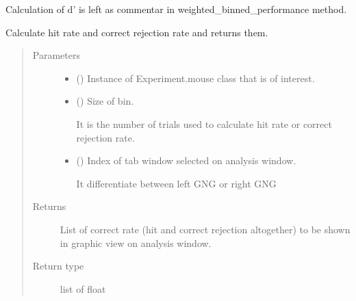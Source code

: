 \documentclass[letterpaper,10pt,english]{sphinxmanual}
\begin{document}
\sphinxAtStartPar
Calculation of d’ is left as commentar in
weighted\_binned\_performance method.

\begin{fulllineitems}
\label{\detokenize{NoSeMazeController/Analysis:Analysis.Analysis.binned_performance}}
\pysigstartsignatures
{}
\pysigstopsignatures
\sphinxAtStartPar
Calculate hit rate and correct rejection rate and returns them.
\begin{quote}\begin{description}
\item[{Parameters}] \leavevmode\begin{itemize}
\item {} 
\sphinxAtStartPar
{} () \textendash{} Instance of Experiment.mouse class that is of interest.

\item {} 
\sphinxAtStartPar
{} () \textendash{} 
\sphinxAtStartPar
Size of bin.

\sphinxAtStartPar
It is the number of trials used to calculate hit rate or
correct rejection rate.


\item {} 
\sphinxAtStartPar
{} () \textendash{} 
\sphinxAtStartPar
Index of tab window selected on analysis window.

\sphinxAtStartPar
It differentiate between left GNG or right GNG


\end{itemize}

\item[{Returns}] \leavevmode
\sphinxAtStartPar
{} \textendash{} List of correct rate (hit and correct rejection altogether) to be shown
in graphic view on analysis window.

\item[{Return type}] \leavevmode
\sphinxAtStartPar
list of float

\end{description}\end{quote}

\end{fulllineitems}
\end{document}
